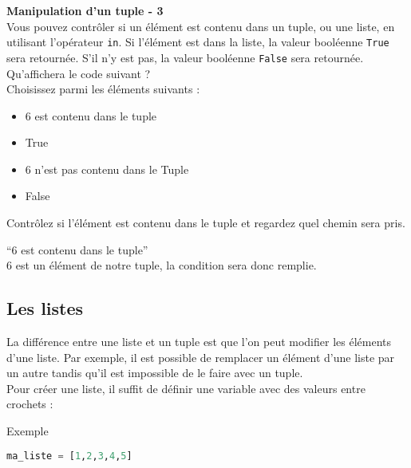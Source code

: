     \begin{Exercice}[5 minutes] \textbf{Manipulation d'un tuple - 3}\\
        Vous pouvez contrôler si un élément est contenu dans un tuple, ou une liste, en utilisant l'opérateur \lstinline{in}. Si l'élément est dans la liste, la valeur booléenne \lstinline{True} sera retournée. S'il n'y est pas, la valeur booléenne \lstinline{False} sera retournée. \\
        
        Qu'affichera le code suivant ? \\
        
        
        
        Choisissez parmi les éléments suivants : \\
        
        \begin{itemize}
        \item 6 est contenu dans le tuple
        \item True
        \item 6 n'est pas contenu dans le Tuple
        \item False
        \end{itemize}
    
        \begin{conseil}
            Contrôlez si l'élément est contenu dans le tuple et regardez quel chemin sera pris.
        \end{conseil}
        
        \begin{solution}
           ``6 est contenu dans le tuple'' \\
           6 est un élément de notre tuple, la condition sera donc remplie.
        \end{solution}
    \end{Exercice}
    
    \subsection{Les listes}
    La différence entre une liste et un tuple est que l'on peut modifier les éléments d'une liste. Par exemple, il est possible de remplacer un élément d'une liste par un autre tandis qu'il est impossible de le faire avec un tuple.
    \\
    Pour créer une liste, il suffit de définir une variable avec des valeurs entre crochets :
    \begin{Example}{\faTerminal \quad Exemple}
        \begin{lstlisting}[language=Python]
            ma_liste = [1,2,3,4,5]   \end{lstlisting}
    \end{Example}
    
